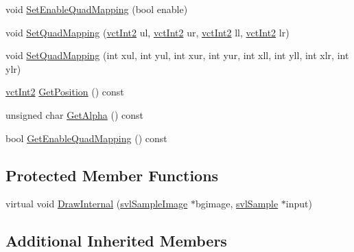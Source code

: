 \begin{DoxyCompactItemize}
void \hyperlink{classsvl_overlay_static_image_ab418d3dfffd9ea7b6dccfba21930c60a}{Set\-Enable\-Quad\-Mapping} (bool enable)
\item 
void \hyperlink{classsvl_overlay_static_image_a0fbf6fa737e9ede062d99d072d545901}{Set\-Quad\-Mapping} (\hyperlink{vct_fixed_size_vector_types_8h_add8c88eb6a432b15f14b866b9c35325f}{vct\-Int2} ul, \hyperlink{vct_fixed_size_vector_types_8h_add8c88eb6a432b15f14b866b9c35325f}{vct\-Int2} ur, \hyperlink{vct_fixed_size_vector_types_8h_add8c88eb6a432b15f14b866b9c35325f}{vct\-Int2} ll, \hyperlink{vct_fixed_size_vector_types_8h_add8c88eb6a432b15f14b866b9c35325f}{vct\-Int2} lr)
\item 
void \hyperlink{classsvl_overlay_static_image_a3c54122734f69aa9cf3a0603c9917974}{Set\-Quad\-Mapping} (int xul, int yul, int xur, int yur, int xll, int yll, int xlr, int ylr)
\item 
\hyperlink{vct_fixed_size_vector_types_8h_add8c88eb6a432b15f14b866b9c35325f}{vct\-Int2} \hyperlink{classsvl_overlay_static_image_a9d257b6689a8264fb55cc5be6fd16fa0}{Get\-Position} () const 
\item 
unsigned char \hyperlink{classsvl_overlay_static_image_a792fe4a10a725649c26429e367be6822}{Get\-Alpha} () const 
\item 
bool \hyperlink{classsvl_overlay_static_image_aba4205b55652d00ad1e2aa976509d4e6}{Get\-Enable\-Quad\-Mapping} () const 
\end{DoxyCompactItemize}
\subsection*{Protected Member Functions}
\begin{DoxyCompactItemize}
\item 
virtual void \hyperlink{classsvl_overlay_static_image_acded095ec0398a19244d48427ac95848}{Draw\-Internal} (\hyperlink{classsvl_sample_image}{svl\-Sample\-Image} $\ast$bgimage, \hyperlink{classsvl_sample}{svl\-Sample} $\ast$input)
\end{DoxyCompactItemize}
\subsection*{Additional Inherited Members}


